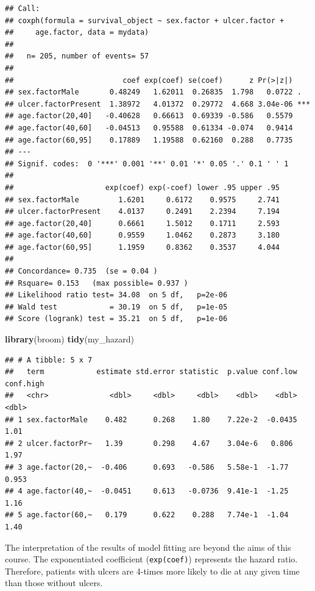 \documentclass[]{book}
\makeatletter
\newenvironment{Shaded}{\begin{snugshade}}{\end{snugshade}}
\newcommand{\KeywordTok}[1]{\textcolor[rgb]{0.13,0.29,0.53}{\textbf{#1}}}
\newcommand{\NormalTok}[1]{#1}
\newenvironment{kframe}{%
\medskip{}
\setlength{\fboxsep}{.8em}
 \def\at@end@of@kframe{}%
 \ifinner\ifhmode%
  \def\at@end@of@kframe{\end{minipage}}%
  \begin{minipage}{\columnwidth}%
 \fi\fi%
 \def\FrameCommand##1{\hskip\@totalleftmargin \hskip-\fboxsep
 \colorbox{shadecolor}{##1}\hskip-\fboxsep
     \hskip-\linewidth \hskip-\@totalleftmargin \hskip\columnwidth}%
 \MakeFramed {\advance\hsize-\width
   \@totalleftmargin\z@ \linewidth\hsize
   \@setminipage}}%
 {\par\unskip\endMakeFramed%
 \at@end@of@kframe}
\renewenvironment{Shaded}{\begin{kframe}}{\end{kframe}}
\theoremstyle{definition}
\theoremstyle{definition}
\theoremstyle{definition}
\theoremstyle{remark}
\makeatother
\begin{document}
\begin{verbatim}
## Call:
## coxph(formula = survival_object ~ sex.factor + ulcer.factor + 
##     age.factor, data = mydata)
## 
##   n= 205, number of events= 57 
## 
##                         coef exp(coef) se(coef)      z Pr(>|z|)    
## sex.factorMale       0.48249   1.62011  0.26835  1.798   0.0722 .  
## ulcer.factorPresent  1.38972   4.01372  0.29772  4.668 3.04e-06 ***
## age.factor(20,40]   -0.40628   0.66613  0.69339 -0.586   0.5579    
## age.factor(40,60]   -0.04513   0.95588  0.61334 -0.074   0.9414    
## age.factor(60,95]    0.17889   1.19588  0.62160  0.288   0.7735    
## ---
## Signif. codes:  0 '***' 0.001 '**' 0.01 '*' 0.05 '.' 0.1 ' ' 1
## 
##                     exp(coef) exp(-coef) lower .95 upper .95
## sex.factorMale         1.6201     0.6172    0.9575     2.741
## ulcer.factorPresent    4.0137     0.2491    2.2394     7.194
## age.factor(20,40]      0.6661     1.5012    0.1711     2.593
## age.factor(40,60]      0.9559     1.0462    0.2873     3.180
## age.factor(60,95]      1.1959     0.8362    0.3537     4.044
## 
## Concordance= 0.735  (se = 0.04 )
## Rsquare= 0.153   (max possible= 0.937 )
## Likelihood ratio test= 34.08  on 5 df,   p=2e-06
## Wald test            = 30.19  on 5 df,   p=1e-05
## Score (logrank) test = 35.21  on 5 df,   p=1e-06
\end{verbatim}

\begin{Shaded}
\begin{Highlighting}[]
\KeywordTok{library}\NormalTok{(broom)}
\KeywordTok{tidy}\NormalTok{(my_hazard)}
\end{Highlighting}
\end{Shaded}

\begin{verbatim}
## # A tibble: 5 x 7
##   term            estimate std.error statistic  p.value conf.low conf.high
##   <chr>              <dbl>     <dbl>     <dbl>    <dbl>    <dbl>     <dbl>
## 1 sex.factorMale    0.482      0.268    1.80    7.22e-2  -0.0435     1.01 
## 2 ulcer.factorPr~   1.39       0.298    4.67    3.04e-6   0.806      1.97 
## 3 age.factor(20,~  -0.406      0.693   -0.586   5.58e-1  -1.77       0.953
## 4 age.factor(40,~  -0.0451     0.613   -0.0736  9.41e-1  -1.25       1.16 
## 5 age.factor(60,~   0.179      0.622    0.288   7.74e-1  -1.04       1.40
\end{verbatim}

The interpretation of the results of model fitting are beyond the aims
of this course. The exponentiated coefficient (\texttt{exp(coef)})
represents the hazard ratio. Therefore, patients with ulcers are 4-times
more likely to die at any given time than those without ulcers.
\end{document}
